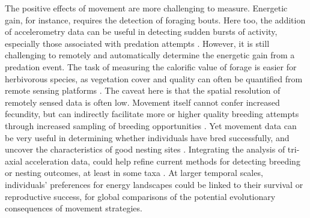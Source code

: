 The positive effects of movement are more challenging to measure.
Energetic gain, for instance, requires the detection of foraging bouts.
Here too, the addition of accelerometry data can be useful in detecting sudden bursts of activity, especially those associated with predation attempts \parencite{williams2014,bryce2017}.
However, it is still challenging to remotely and automatically determine the energetic gain from a predation event.
The task of measuring the calorific value of forage is easier for herbivorous species, as vegetation cover and quality can often be quantified from remote sensing platforms \parencite{pettorelli2011}.
The caveat here is that the spatial resolution of remotely sensed data is often low.
Movement itself cannot confer increased fecundity, but can indirectly facilitate more or higher quality breeding attempts through increased sampling of breeding opportunities \parencite[as in][]{kempenaers2017}.
Yet movement data can be very useful in determining whether individuals have bred successfully, and uncover the characteristics of good nesting sites \parencite{picardi2020}.
Integrating the analysis of tri-axial acceleration data, could help refine current methods for detecting breeding or nesting outcomes, at least in some taxa \parencite{schreven2021}.
At larger temporal scales, individuals' preferences for energy landscapes could be linked to their survival or reproductive success, for global comparisons of the potential evolutionary consequences of movement strategies.

{ \begin{center}  \end{center} }
